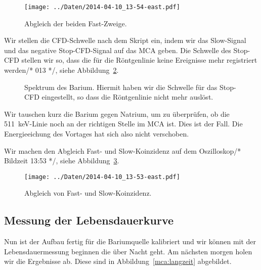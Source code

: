 \begin{figure}[htbp]
    \centering
    \texttt{[image: ../Daten/2014-04-10\_13-54-east.pdf]}
    \caption{%
        Abgleich der beiden Fast-Zweige.
    }
    \label{fig:fast_abgleich_oszi}
\end{figure}

Wir stellen die CFD-Schwelle nach dem Skript ein, indem wir das Slow-Signal
und das negative Stop-CFD-Signal auf das MCA geben. Die Schwelle des Stop-CFD
stellen wir so, dass die für die Röntgenlinie keine Ereignisse mehr registriert
werden/* 013 */, siehe Abbildung~\ref{mca:xray}.

\begin{figure}[htbp]
    \centering
    \caption{%
        Spektrum des Barium. Hiermit haben wir die Schwelle für das Stop-CFD
        eingestellt, so dass die Röntgenlinie nicht mehr auslöst.
    }
    \label{mca:xray}
\end{figure}

Wir tauschen kurz die Barium gegen Natrium, um zu überprüfen, ob die
\SI{511}{\kilo\electronvolt}-Linie noch an der richtigen Stelle im MCA ist.
Dies ist der Fall. Die Energieeichung des Vortages hat sich also nicht
verschoben.

Wir machen den Abgleich Fast- und Slow-Koinzidenz auf dem Oszilloskop/* Bildzeit
13:53 */, siehe Abbildung~\ref{fig:fast-slow-abgleich}.

\begin{figure}[htbp]
    \centering
    \texttt{[image: ../Daten/2014-04-10\_13-53-east.pdf]}
    \caption{%
        Abgleich von Fast- und Slow-Koinzidenz.
    }
    \label{fig:fast-slow-abgleich}
\end{figure}

\subsection{Messung der Lebensdauerkurve}

Nun ist der Aufbau fertig für die Bariumquelle kalibriert und wir können mit
der Lebensdauermessung beginnen die über Nacht geht. Am nächsten morgen holen
wir die Ergebnisse ab. Diese sind in Abbildung~\ref{mca:langzeit} abgebildet.

